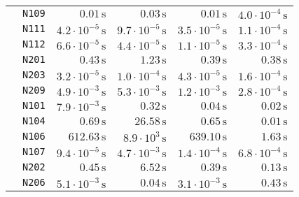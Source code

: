 \begin{tabular}{cc|rrrr}
 & \texttt{\footnotesize                 N109} & $             0.01\,\text{s}$ & $             0.03\,\text{s}$ & $             0.01\,\text{s}$ & $ 4.0\cdot 10^{-4}\,\text{s}$\\
 & \texttt{\footnotesize                 N111} & $ 4.2\cdot 10^{-5}\,\text{s}$ & $ 9.7\cdot 10^{-5}\,\text{s}$ & $ 3.5\cdot 10^{-5}\,\text{s}$ & $ 1.1\cdot 10^{-4}\,\text{s}$\\
 & \texttt{\footnotesize                 N112} & $ 6.6\cdot 10^{-5}\,\text{s}$ & $ 4.4\cdot 10^{-5}\,\text{s}$ & $ 1.1\cdot 10^{-5}\,\text{s}$ & $ 3.3\cdot 10^{-4}\,\text{s}$\\
 & \texttt{\footnotesize                 N201} & $             0.43\,\text{s}$ & $             1.23\,\text{s}$ & $             0.39\,\text{s}$ & $             0.38\,\text{s}$\\
 & \texttt{\footnotesize                 N203} & $ 3.2\cdot 10^{-5}\,\text{s}$ & $ 1.0\cdot 10^{-4}\,\text{s}$ & $ 4.3\cdot 10^{-5}\,\text{s}$ & $ 1.6\cdot 10^{-4}\,\text{s}$\\
 & \texttt{\footnotesize                 N209} & $ 4.9\cdot 10^{-3}\,\text{s}$ & $ 5.3\cdot 10^{-3}\,\text{s}$ & $ 1.2\cdot 10^{-3}\,\text{s}$ & $ 2.8\cdot 10^{-4}\,\text{s}$\\
 & \texttt{\footnotesize                 N101} & $ 7.9\cdot 10^{-3}\,\text{s}$ & $             0.32\,\text{s}$ & $             0.04\,\text{s}$ & $             0.02\,\text{s}$\\
 & \texttt{\footnotesize                 N104} & $             0.69\,\text{s}$ & $            26.58\,\text{s}$ & $             0.65\,\text{s}$ & $             0.01\,\text{s}$\\
 & \texttt{\footnotesize                 N106} & $           612.63\,\text{s}$ & $  8.9\cdot 10^{3}\,\text{s}$ & $           639.10\,\text{s}$ & $             1.63\,\text{s}$\\
 & \texttt{\footnotesize                 N107} & $ 9.4\cdot 10^{-5}\,\text{s}$ & $ 4.7\cdot 10^{-3}\,\text{s}$ & $ 1.4\cdot 10^{-4}\,\text{s}$ & $ 6.8\cdot 10^{-4}\,\text{s}$\\
 & \texttt{\footnotesize                 N202} & $             0.45\,\text{s}$ & $             6.52\,\text{s}$ & $             0.39\,\text{s}$ & $             0.13\,\text{s}$\\
 & \texttt{\footnotesize                 N206} & $ 5.1\cdot 10^{-3}\,\text{s}$ & $             0.04\,\text{s}$ & $ 3.1\cdot 10^{-3}\,\text{s}$ & $             0.43\,\text{s}$\\

\end{tabular}
